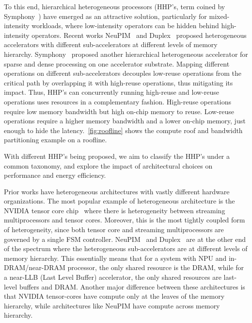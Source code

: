 To this end, hierarchical heterogeneous processors (HHP's, term coined by Symphony~\cite{symphony}) have emerged as an attractive solution, particularly for mixed-intensity workloads, where low-intensity operators can be hidden behind high-intensity operators. Recent works NeuPIM~\cite{neupim} and Duplex~\cite{duplex} proposed heterogeneous accelerators with different sub-accelerators at different levels of memory hierarchy. Symphony~\cite{symphony} proposed another hierarchical heterogeneous accelerator for sparse and dense processing on one accelerator substrate.
Mapping different operations on different sub-accelerators decouples low-reuse operations from the critical path by overlapping it with high-reuse operations, thus mitigating its impact. 
Thus, HHP's can concurrently running high-reuse and low-reuse operations uses resources in a complementary fashion. High-reuse operations require low memory bandwidth but high on-chip memory to reuse. Low-reuse operations require a higher memory bandwidth and a lower on-chip memory, just enough to hide the latency.~\autoref{fig:roofline} shows the compute roof and bandwidth partitioning example on a roofline.

With different HHP's being proposed, we aim to classify the HHP's under a common taxonomy, and explore the impact of architectural choices on performance and energy efficiency. 


Prior works have heterogeneous architectures with vastly different hardware organizations.
 The most popular example of heterogeneous architecture is the NVIDIA tensor core chip~\cite{blackwell} where there is heterogeneity between streaming multiprocessors and tensor cores. Moreover, this is the most tightly coupled form of heterogeneity, since both tensor core and streaming multiprocessors are governed by a single FSM controller. NeuPIM~\cite{neupim} and Duplex~\cite{duplex} are at the other end of the spectrum where the heterogeneous sub-accelerators are at different levels of memory hierarchy. This essentially means that for a system with NPU and in-DRAM/near-DRAM processor, the only shared resource is the DRAM, while for a near-LLB (Last Level Buffer) accelerator, the only shared resources are last-level buffers and DRAM. Another major difference between these architectures is that NVIDIA tensor-cores have compute only at the leaves of the memory hierarchy, while architectures like NeuPIM have compute across memory hierarchy.



